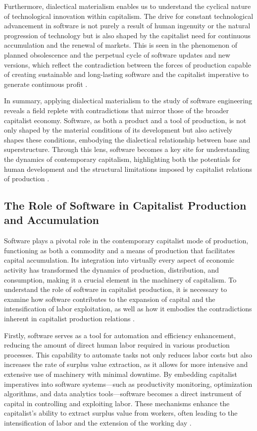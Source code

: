 \begin{refsection}
Furthermore, dialectical materialism enables us to understand the cyclical nature of technological innovation within capitalism. The drive for constant technological advancement in software is not purely a result of human ingenuity or the natural progression of technology but is also shaped by the capitalist need for continuous accumulation and the renewal of markets. This is seen in the phenomenon of planned obsolescence and the perpetual cycle of software updates and new versions, which reflect the contradiction between the forces of production capable of creating sustainable and long-lasting software and the capitalist imperative to generate continuous profit \cite[pp.~89-93]{caffentzis2013}.

In summary, applying dialectical materialism to the study of software engineering reveals a field replete with contradictions that mirror those of the broader capitalist economy. Software, as both a product and a tool of production, is not only shaped by the material conditions of its development but also actively shapes these conditions, embodying the dialectical relationship between base and superstructure. Through this lens, software becomes a key site for understanding the dynamics of contemporary capitalism, highlighting both the potentials for human development and the structural limitations imposed by capitalist relations of production \cite[pp.~1-25]{marx2008}.

\subsection{The Role of Software in Capitalist Production and Accumulation}

Software plays a pivotal role in the contemporary capitalist mode of production, functioning as both a commodity and a means of production that facilitates capital accumulation. Its integration into virtually every aspect of economic activity has transformed the dynamics of production, distribution, and consumption, making it a crucial element in the machinery of capitalism. To understand the role of software in capitalist production, it is necessary to examine how software contributes to the expansion of capital and the intensification of labor exploitation, as well as how it embodies the contradictions inherent in capitalist production relations \cite[pp.~105-112]{mosco2011}.

Firstly, software serves as a tool for automation and efficiency enhancement, reducing the amount of direct human labor required in various production processes. This capability to automate tasks not only reduces labor costs but also increases the rate of surplus value extraction, as it allows for more intensive and extensive use of machinery with minimal downtime. By embedding capitalist imperatives into software systems—such as productivity monitoring, optimization algorithms, and data analytics tools—software becomes a direct instrument of capital in controlling and exploiting labor. These mechanisms enhance the capitalist's ability to extract surplus value from workers, often leading to the intensification of labor and the extension of the working day \cite[pp.~57-63]{fuchs2014}.


\end{refsection}
